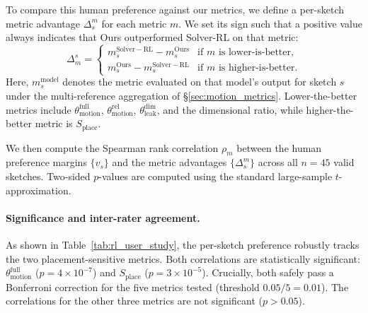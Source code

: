 To compare this human preference against our metrics, we define a per-sketch metric advantage $\Delta^{m}_s$ for each metric $m$. We set its sign such that a positive value always indicates that Ours outperformed Solver-RL on that metric:\\
\begin{equation}
    \Delta_m^s = \begin{cases}
        m^\mathrm{Solver-RL}_s - m^\mathrm{Ours}_s & \text{if } m \text{ is lower-is-better}, \\
        m^\mathrm{Ours}_s - m^\mathrm{Solver-RL}_s & \text{if } m \text{ is higher-is-better}.
    \end{cases}
\end{equation}
Here, $m^{\text{model}}_s$ denotes the metric evaluated on that model's output for sketch $s$ under the multi-reference aggregation of \S\ref{sec:motion_metrics}. Lower-the-better metrics include $\theta_\mathrm{motion}^\mathrm{full}$, $\theta_\mathrm{motion}^\mathrm{rel}$, $\theta_\mathrm{leak}^\mathrm{dim}$, and the dimensional ratio, while higher-the-better metric is $S_\mathrm{place}$.

We then compute the Spearman rank correlation $\rho_m$ between the human preference margins $\{v_s\}$ and the metric advantages $\{\Delta^{m}_s\}$ across all $n=45$ valid sketches. Two-sided $p$-values are computed using the standard large-sample $t$-approximation.

\paragraph{Significance and inter-rater agreement.}

As shown in Table~\ref{tab:rl_user_study}, the per-sketch preference robustly tracks the two placement-sensitive metrics. Both correlations are statistically significant: $\theta_{\mathrm{motion}}^{\mathrm{full}}$ ($p=4{\times}10^{-7}$) and $S_{\mathrm{place}}$ ($p=3{\times}10^{-5}$). Crucially, both safely pass a Bonferroni correction for the five metrics tested (threshold $0.05/5=0.01$). The correlations for the other three metrics are not significant ($p > 0.05$).

